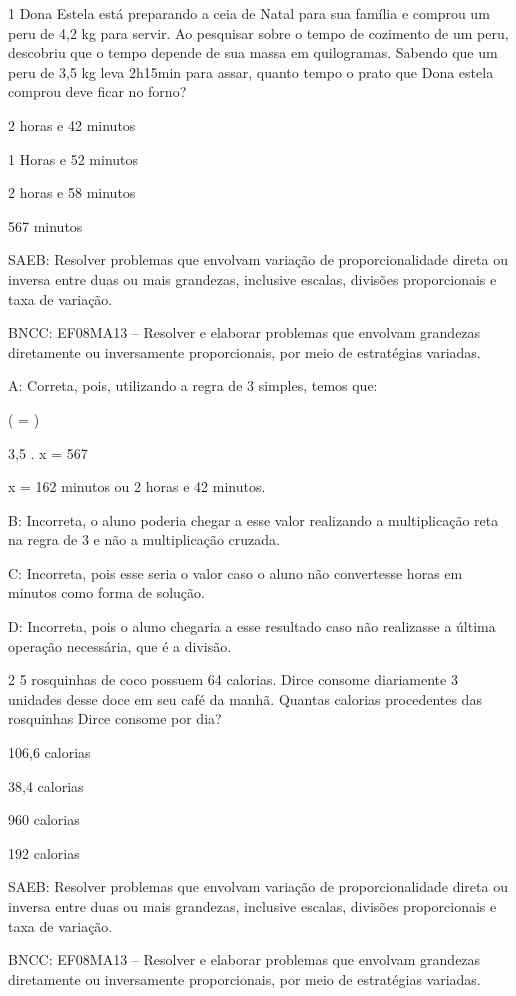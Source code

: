 {\num{1} Dona Estela está preparando a ceia de Natal para sua família e
comprou um peru de 4,2 kg para servir. Ao pesquisar sobre o tempo de
cozimento de um peru, descobriu que o tempo depende de sua massa em
quilogramas. Sabendo que um peru de 3,5 kg leva 2h15min para assar,
quanto tempo o prato que Dona estela comprou deve ficar no forno?
\item 2 horas e 42 minutos
\item 1 Horas e 52 minutos
\item 2 horas e 58 minutos
\item 567 minutos

SAEB: Resolver problemas que envolvam variação de proporcionalidade
direta ou inversa entre duas ou mais grandezas, inclusive escalas,
divisões proporcionais e taxa de variação.

BNCC: EF08MA13 -- Resolver e elaborar problemas que envolvam grandezas
diretamente ou inversamente proporcionais, por meio de estratégias
variadas.

A: Correta, pois, utilizando a regra de 3 simples, temos que:

( = )

3,5 . x = 567

x = 162 minutos ou 2 horas e 42 minutos.

B: Incorreta, o aluno poderia chegar a esse valor realizando a
multiplicação reta na regra de 3 e não a multiplicação cruzada.

C: Incorreta, pois esse seria o valor caso o aluno não convertesse horas
em minutos como forma de solução.

D: Incorreta, pois o aluno chegaria a esse resultado caso não realizasse
a última operação necessária, que é a divisão.

\num{2} 5 rosquinhas de coco possuem 64 calorias. Dirce consome diariamente 3
unidades desse doce em seu café da manhã. Quantas calorias procedentes
das rosquinhas Dirce consome por dia?
\item 106,6 calorias
\item 38,4 calorias
\item 960 calorias
\item 192 calorias

SAEB: Resolver problemas que envolvam variação de proporcionalidade
direta ou inversa entre duas ou mais grandezas, inclusive escalas,
divisões proporcionais e taxa de variação.

BNCC: EF08MA13 -- Resolver e elaborar problemas que envolvam grandezas
diretamente ou inversamente proporcionais, por meio de estratégias
variadas.

}
